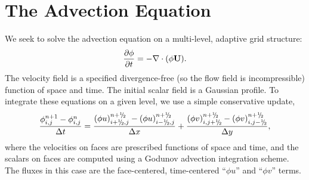 \section{The Advection Equation}
We seek to solve the advection equation on a multi-level, adaptive grid structure:
\begin{equation}
\frac{\partial\phi}{\partial t} = -\nabla\cdot(\phi{\bf U}).
\end{equation}
The velocity field is a specified divergence-free (so the flow field is incompressible)
function of space and time.  The initial scalar field is a
Gaussian profile.  To integrate these equations on a given level, we use a simple conservative update,
\begin{equation}
\frac{\phi_{i,j}^{n+1}-\phi_{i,j}^n}{\Delta t} = \frac{(\phi u)_{i+\myhalf,j}^{n+\myhalf}-(\phi u)_{i-\myhalf,j}^{n+\myhalf}}{\Delta x} + \frac{(\phi v)_{i,j+\myhalf}^{n+\myhalf} - (\phi v)_{i,j-\myhalf}^{n+\myhalf}}{\Delta y},
\end{equation}
where the velocities on faces are prescribed functions of space and time, and the scalars on faces
are computed using a Godunov advection integration scheme.  The fluxes in this case are the face-centered,
time-centered ``$\phi u$'' and ``$\phi v$'' terms.

